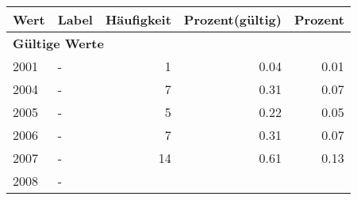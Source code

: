      \begin{longtable}{lXrrr}
     \toprule
     \textbf{Wert} & \textbf{Label} & \textbf{Häufigkeit} & \textbf{Prozent(gültig)} & \textbf{Prozent} \\
     \endhead
     \midrule
     \multicolumn{5}{l}{\textbf{Gültige Werte}}\\

     2001 &
     \multicolumn{1}{X}{ -  } &


       \num{1} &
       \num[round-mode=places,round-precision=2]{0.04} &
         \num[round-mode=places,round-precision=2]{0.01} \\

     2004 &
     \multicolumn{1}{X}{ -  } &


       \num{7} &
       \num[round-mode=places,round-precision=2]{0.31} &
         \num[round-mode=places,round-precision=2]{0.07} \\

     2005 &
     \multicolumn{1}{X}{ -  } &


       \num{5} &
       \num[round-mode=places,round-precision=2]{0.22} &
         \num[round-mode=places,round-precision=2]{0.05} \\

     2006 &
     \multicolumn{1}{X}{ -  } &


       \num{7} &
       \num[round-mode=places,round-precision=2]{0.31} &
         \num[round-mode=places,round-precision=2]{0.07} \\

     2007 &
     \multicolumn{1}{X}{ -  } &


       \num{14} &
       \num[round-mode=places,round-precision=2]{0.61} &
         \num[round-mode=places,round-precision=2]{0.13} \\

     2008 &
     \multicolumn{1}{X}{ -  } &



\end{longtable}
